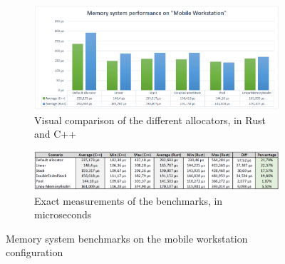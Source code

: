 \begin{figure}[h!]
	\centering
	\begin{subfigure}[b]{\textwidth}
		\includegraphics[width=1\linewidth]{PICs/mem_bench_workstation.png}
		\caption{Visual comparison of the different allocators, in Rust and C++}
		\label{fig:mem_bench_workstation} 
	\end{subfigure}
	
	\begin{subfigure}[b]{\textwidth}
		\includegraphics[width=1\linewidth]{PICs/mem_bench_workstation_data.png}
		\caption{Exact measurements of the benchmarks, in microseconds}
		\label{fig:mem_bench_blade}
	\end{subfigure}
	
	\caption[Memory benchmarks workstation]{Memory system benchmarks on the mobile workstation configuration}
\end{figure}

\clearpage

